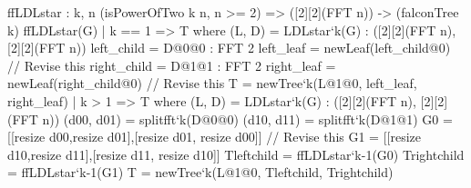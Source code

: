  \begin{algorithm}[!htb]
 \caption{$\ffldl(\matG)$\hfill}\label{alg:ffldl}
 \begin{algorithmic}[1]
 \State {$(\L,\matD) \leftarrow \ldlalgo(\matG)$}\label{step:ldl}
 \Return \tree
 \Else
 \label{line:gram}
 \Return \tree
 \EndIf
 \end{algorithmic}
 \end{algorithm}

\begin{code}
  ffLDLstar : {k, n} (isPowerOfTwo k n, n >= 2) =>
    ([2][2](FFT n)) -> (falconTree k)
  ffLDLstar(G)
    | k == 1 => T where
        (L, D) = LDLstar`{k}(G) : ([2][2](FFT n), [2][2](FFT n))
        left_child = D@0@0 : FFT 2
        left_leaf = newLeaf(left_child@0) // Revise this
        right_child = D@1@1 : FFT 2
        right_leaf = newLeaf(right_child@0) // Revise this
        T = newTree`{k}(L@1@0, left_leaf, right_leaf)
    | k >  1 => T where
        (L, D) = LDLstar`{k}(G) : ([2][2](FFT n), [2][2](FFT n))
        (d00, d01) = splitfft`{k}(D@0@0)
        (d10, d11) = splitfft`{k}(D@1@1)
        G0 = [[resize d00,resize d01],[resize d01, resize d00]] // Revise this
        G1 = [[resize d10,resize d11],[resize d11, resize d10]]
        Tleftchild = ffLDLstar`{k-1}(G0)
        Trightchild = ffLDLstar`{k-1}(G1)
        T = newTree`{k}(L@1@0, Tleftchild, Trightchild)
\end{code}


